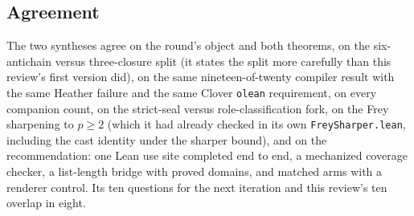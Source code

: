 \documentclass[11pt,a4paper]{article}
\newcommand{\code}[1]{\nolinkurl{#1}}
\theoremstyle{definition}
\theoremstyle{plain}
\begin{document}
\subsection{Agreement}
The two syntheses agree on the round's object and both theorems, on the six-antichain versus three-closure split (it states the split more carefully than this review's first version did), on the same nineteen-of-twenty compiler result with the same Heather failure and the same Clover \code{olean} requirement, on every companion count, on the strict-seal versus role-classification fork, on the Frey sharpening to $p\ge2$ (which it had already checked in its own \code{FreySharper.lean}, including the cast identity under the sharper bound), and on the recommendation: one Lean use site completed end to end, a mechanized coverage checker, a list-length bridge with proved domains, and matched arms with a renderer control. Its ten questions for the next iteration and this review's ten overlap in eight.
\end{document}
